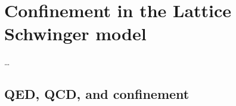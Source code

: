 \documentclass[../main.tex]{subfiles} %
\begin{document}
\chapter{Confinement in the Lattice Schwinger model} \label{chap:Confinement}

\ldots



\section{QED, QCD, and confinement}

\lipsum[1-2]
\end{document}
